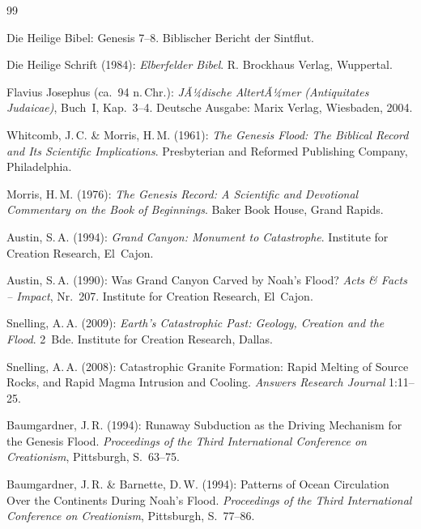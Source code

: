 ﻿\documentclass[12pt,a4paper]{report}
\begin{document}
\begin{thebibliography}{99}


Die Heilige Bibel: Genesis 7--8. Biblischer Bericht der Sintflut.

Die Heilige Schrift (1984): \textit{Elberfelder Bibel}. R. Brockhaus Verlag, Wuppertal.

Flavius Josephus (ca.\ 94 n.\,Chr.): \textit{JÃ¼dische AltertÃ¼mer (Antiquitates Judaicae)}, Buch~I, Kap.\ 3--4. Deutsche Ausgabe: Marix Verlag, Wiesbaden, 2004.


Whitcomb, J.\,C. \& Morris, H.\,M. (1961): \textit{The Genesis Flood: The Biblical Record and Its Scientific Implications}. Presbyterian and Reformed Publishing Company, Philadelphia.

Morris, H.\,M. (1976): \textit{The Genesis Record: A Scientific and Devotional Commentary on the Book of Beginnings}. Baker Book House, Grand Rapids.

Austin, S.\,A. (1994): \textit{Grand Canyon: Monument to Catastrophe}. Institute for Creation Research, El~Cajon.

Austin, S.\,A. (1990): Was Grand Canyon Carved by Noah's Flood? \textit{Acts \& Facts -- Impact}, Nr.\ 207. Institute for Creation Research, El~Cajon.

Snelling, A.\,A. (2009): \textit{Earth's Catastrophic Past: Geology, Creation and the Flood}. 2~Bde. Institute for Creation Research, Dallas.

Snelling, A.\,A. (2008): Catastrophic Granite Formation: Rapid Melting of Source Rocks, and Rapid Magma Intrusion and Cooling. \textit{Answers Research Journal} 1:11--25.

Baumgardner, J.\,R. (1994): Runaway Subduction as the Driving Mechanism for the Genesis Flood. \textit{Proceedings of the Third International Conference on Creationism}, Pittsburgh, S.\ 63--75.

Baumgardner, J.\,R. \& Barnette, D.\,W. (1994): Patterns of Ocean Circulation Over the Continents During Noah's Flood. \textit{Proceedings of the Third International Conference on Creationism}, Pittsburgh, S.\ 77--86.


\end{thebibliography}
\end{document}

